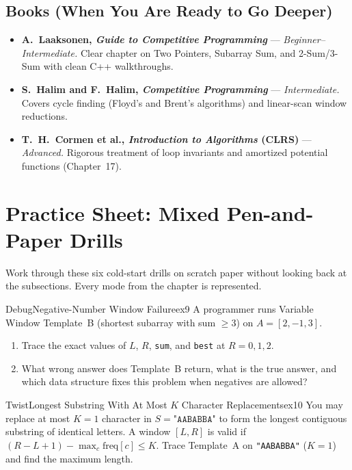 \documentclass[11pt,a4paper]{article}
\theoremstyle{definition}
\begin{document}
\subsection*{Books (When You Are Ready to Go Deeper)}
\begin{itemize}
    \item \textbf{A.\ Laaksonen, \emph{Guide to Competitive Programming}} --- \emph{Beginner--Intermediate.} Clear chapter on Two Pointers, Subarray Sum, and 2-Sum/3-Sum with clean C++ walkthroughs.
    \item \textbf{S.\ Halim and F.\ Halim, \emph{Competitive Programming}} --- \emph{Intermediate.} Covers cycle finding (Floyd's and Brent's algorithms) and linear-scan window reductions.
    \item \textbf{T.\ H.\ Cormen et al., \emph{Introduction to Algorithms} (CLRS)} --- \emph{Advanced.} Rigorous treatment of loop invariants and amortized potential functions (Chapter~17).
\end{itemize}

\section*{Practice Sheet: Mixed Pen-and-Paper Drills}

Work through these six cold-start drills on scratch paper without looking back at the subsections. Every mode from the chapter is represented.

\begin{tryitbox}{Debug}{Negative-Number Window Failure}{ex9}
A programmer runs Variable Window Template~B (shortest subarray with sum $\ge 3$) on $A = [2, -1, 3]$.
\begin{enumerate}[itemsep=2pt, topsep=2pt]
    \item Trace the exact values of $L$, $R$, \texttt{sum}, and \texttt{best} at $R = 0, 1, 2$.
    \item What wrong answer does Template~B return, what is the true answer, and which data structure fixes this problem when negatives are allowed?
\end{enumerate}
\end{tryitbox}

\begin{tryitbox}{Twist}{Longest Substring With At Most $K$ Character Replacements}{ex10}
You may replace at most $K = 1$ character in $S = \texttt{"AABABBA"}$ to form the longest contiguous substring of identical letters. A window $[L, R]$ is valid if $(R - L + 1) - \max_{c} \text{freq}[c] \le K$. Trace Template~A on \texttt{"AABABBA"} ($K = 1$) and find the maximum length.
\end{tryitbox}
\end{document}
